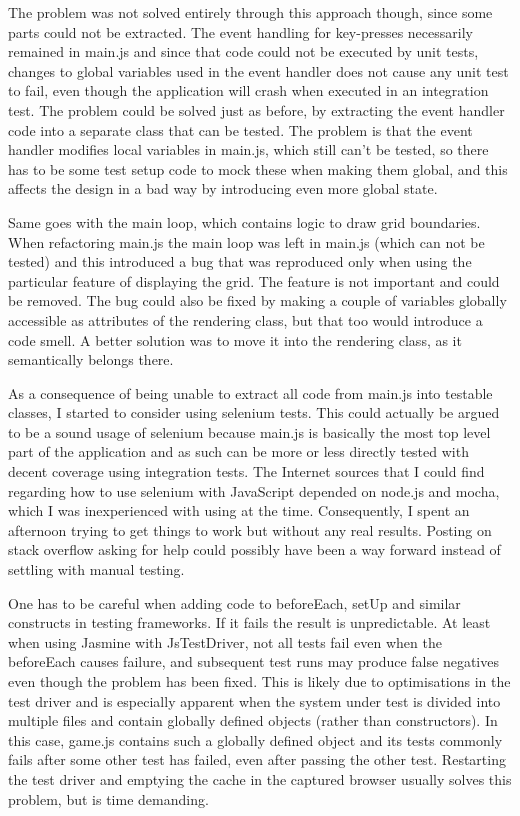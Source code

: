 \documentclass[11pt]{article}
\begin{document}
The problem was not solved entirely through this approach though, since some parts could not be extracted. The event handling for key-presses necessarily remained in main.js and since that code could not be executed by unit tests, changes to global variables used in the event handler does not cause any unit test to fail, even though the application will crash when executed in an integration test. The problem could be solved just as before, by extracting the event handler code into a separate class that can be tested. The problem is that the event handler modifies local variables in main.js, which still can't be tested, so there has to be some test setup code to mock these when making them global, and this affects the design in a bad way by introducing even more global state.

Same goes with the main loop, which contains logic to draw grid boundaries. When refactoring main.js the main loop was left in main.js (which can not be tested) and this introduced a bug that was reproduced only when using the particular feature of displaying the grid. The feature is not important and could be removed. The bug could also be fixed by making a couple of variables globally accessible as attributes of the rendering class, but that too would introduce a code smell. A better solution was to move it into the rendering class, as it semantically belongs there.

As a consequence of being unable to extract all code from main.js into testable classes, I started to consider using selenium tests. This could actually be argued to be a sound usage of selenium because main.js is basically the most top level part of the application and as such can be more or less directly tested with decent coverage using integration tests. The Internet sources that I could find regarding how to use selenium with JavaScript depended on node.js and mocha, which I was inexperienced with using at the time. Consequently, I spent an afternoon trying to get things to work but without any real results. Posting on stack overflow asking for help could possibly have been a way forward instead of settling with manual testing.

One has to be careful when adding code to beforeEach, setUp and similar constructs in testing frameworks. If it fails the result is unpredictable. At least when using Jasmine with JsTestDriver, not all tests fail even when the beforeEach causes failure, and subsequent test runs may produce false negatives even though the problem has been fixed. This is likely due to optimisations in the test driver and is especially apparent when the system under test is divided into multiple files and contain globally defined objects (rather than constructors). In this case, game.js contains such a globally defined object and its tests commonly fails after some other test has failed, even after passing the other test. Restarting the test driver and emptying the cache in the captured browser usually solves this problem, but is time demanding.
\end{document}
